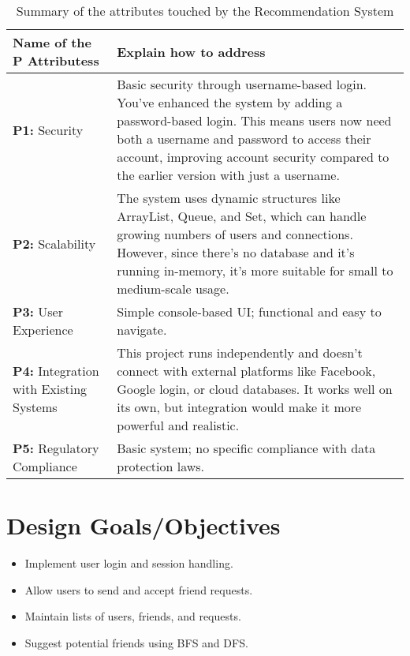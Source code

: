 \documentclass[12pt]{report}
\begin{document}
\begin{table}[htbp]
   \centering
    \caption{Summary of the attributes touched by the Recommendation System}
    \begin{tabular}{|p{6.5 cm}|p{8 cm}|}
    \toprule
        \textbf{Name of the P Attributess} & \textbf{Explain how to address}  \\
        \midrule

    \textbf{P1:} Security  & Basic security through username-based login. You’ve enhanced the system by adding a password-based login. This means users now need both a username and password to access their account, improving account security compared to the earlier version with just a username.  \\
      \hline
       
    \textbf{P2:} Scalability  &  The system uses dynamic structures like ArrayList, Queue, and Set, which can handle growing numbers of users and connections. However, since there’s no database and it's running in-memory, it's more suitable for small to medium-scale usage. \\
      \hline

    \textbf{P3:} User Experience  &  Simple console-based UI; functional and easy to navigate. \\
    \hline
    
    \textbf{P4:} Integration with Existing Systems   &  This project runs independently and doesn’t connect with external platforms like Facebook, Google login, or cloud databases. It works well on its own, but integration would make it more powerful and realistic. \\ 
    \hline
    \textbf{P5:} Regulatory Compliance  &  Basic system; no specific compliance with data protection laws. \\
      \hline      
    \end{tabular}
    \label{tab:CEP}
\end{table}

\section{Design Goals/Objectives}
\begin{itemize}
  \item Implement user login and session handling.
  \item Allow users to send and accept friend requests.
  \item Maintain lists of users, friends, and requests.
  \item Suggest potential friends using BFS and DFS.
\end{itemize}
\end{document}
